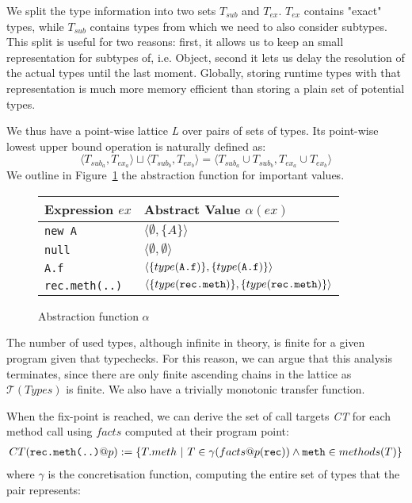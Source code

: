 We split the type information into two sets $T_{sub}$ and $T_{ex}$. $T_{ex}$
contains "exact" types, while $T_{sub}$ contains types from which we need to
also consider subtypes. This split is useful for two reasons: first, it allows
us to keep an small representation for subtypes of, i.e. Object, second it
lets us delay the resolution of the actual types until the last moment.
Globally, storing runtime types with that representation is much more memory
efficient than storing a plain set of potential types.

We thus have a point-wise lattice \emph{L} over pairs of sets of types. Its
point-wise lowest upper bound operation is naturally defined as:
$$
    \langle T_{sub_a}, T_{ex_a} \rangle \sqcup  \langle T_{sub_b}, T_{ex_b} \rangle =  \langle T_{sub_a} \cup T_{sub_b}, T_{ex_a} \cup T_{ex_b} \rangle
$$
We outline in Figure~\ref{fig:ta:tf}
the abstraction function for important values.
\FloatBarrier
\begin{figure}[h]
    \centering

    \begin{tabular}{ l | l }
        Expression $ex$       & Abstract Value $\alpha(ex)$\\
        \hline
        \verb/new A/          & $\langle \emptyset, \{ A \} \rangle$ \\
        \verb/null/           & $\langle \emptyset, \emptyset \rangle$ \\
        \verb/A.f/            & $\langle\{type(\verb/A.f/)\}, \{type(\verb/A.f/)\} \rangle$ \\
        \verb/rec.meth(..)/   & $\langle\{type(\verb/rec.meth/)\}, \{type(\verb/rec.meth/)\} \rangle$ \\
    \end{tabular}

    \caption{Abstraction function $\alpha$}
    \label{fig:ta:tf}
\end{figure}

The number of used types, although infinite in theory, is finite for a given
program given that typechecks.  For this reason, we can argue that this
analysis terminates, since there are only finite ascending chains in the
lattice as $\mathcal{T}(Types)$ is finite. We also have a trivially monotonic
transfer function.

When the fix-point is reached, we can derive the set of call targets \emph{CT}
for each method call using $facts$ computed at their program point:
\begin{eqnarray*}
    CT(\verb/rec.meth(..)/ @ p) := \{ T.meth ~|~ T \in \gamma(facts@p(\verb/rec/)) \land \verb/meth/ \in methods(T) \}
\end{eqnarray*}
where $\gamma$ is the concretisation function, computing the entire set of
types that the pair represents:

